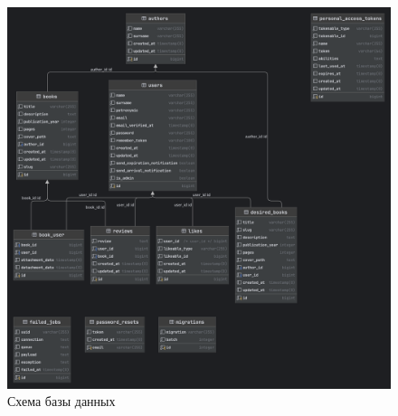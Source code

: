 \documentclass[project.tex]{subfiles}
\begin{document}
\begin{figure}[H]
   \caption{Схема базы данных} 
   \label{pic}
   \includegraphics[width=\textwidth]{../../graphics/db-uml.png}
\end{figure}
\end{document}
